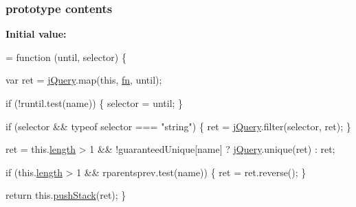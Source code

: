 \subsubsection[{\texorpdfstring{contents}{contents}}]{ {\bf prototype} contents}\hypertarget{jquery-2_82_81-vsdoc_8js_af81eeab332c74dc521f6610f4914badd}{}\label{jquery-2_82_81-vsdoc_8js_af81eeab332c74dc521f6610f4914badd}
{\bfseries Initial value\+:}
\begin{DoxyCode}
= \textcolor{keyword}{function} (until, selector) \{
        

        var ret = \hyperlink{jquery-2_82_81-vsdoc_8js_add5237586d970a38a81f990e8eb28c6c}{jQuery}.map(\textcolor{keyword}{this}, \hyperlink{jquery-2_82_81-vsdoc_8js_acef6bdaf6b9b20fdcca1ea86f0902c3b}{fn}, until);

        \textcolor{keywordflow}{if} (!runtil.test(name)) \{
            selector = until;
        \}

        \textcolor{keywordflow}{if} (selector && typeof selector === \textcolor{stringliteral}{"string"}) \{
            ret = \hyperlink{jquery-2_82_81-vsdoc_8js_add5237586d970a38a81f990e8eb28c6c}{jQuery}.filter(selector, ret);
        \}

        ret = this.\hyperlink{jquery-2_82_81-vsdoc_8js_aa7de35d58da66d9944ab9cbe82c19640}{length} > 1 && !guaranteedUnique[name] ? \hyperlink{jquery-2_82_81-vsdoc_8js_add5237586d970a38a81f990e8eb28c6c}{jQuery}.unique(ret) : ret;

        \textcolor{keywordflow}{if} (this.\hyperlink{jquery-2_82_81-vsdoc_8js_aa7de35d58da66d9944ab9cbe82c19640}{length} > 1 && rparentsprev.test(name)) \{
            ret = ret.reverse();
        \}

        \textcolor{keywordflow}{return} this.\hyperlink{jquery-2_82_81-vsdoc_8js_afc3a7db1ef2b526338c06c07cecccd44}{pushStack}(ret);
    \}
\end{DoxyCode}
